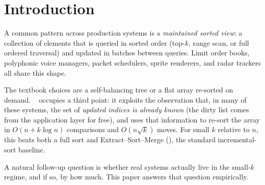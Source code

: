 \section{Introduction}
\label{sec:intro}

A common pattern across production systems is a \emph{maintained sorted view}:
a collection of elements that is queried in sorted order (top-$k$, range scan,
or full ordered traversal) and updated in batches between queries. Limit order
books, polyphonic voice managers, packet schedulers, sprite renderers, and
radar trackers all share this shape.

The textbook choices are a self-balancing tree or a flat array re-sorted on
demand. \DeltaSort~\cite{deltasort} occupies a third point: it exploits the
observation that, in many of these systems, the set of \emph{updated indices is
already known} (the dirty list comes from the application layer for free), and
uses that information to re-sort the array in $O(n + k \log n)$ comparisons and
$O(n\sqrt{k})$ moves. For small $k$ relative to $n$, this beats both a full
sort and Extract--Sort--Merge (\ESM), the standard incremental-sort baseline.

A natural follow-up question is whether real systems actually live in the
small-$k$ regime, and if so, by how much. This paper answers that question
empirically.

